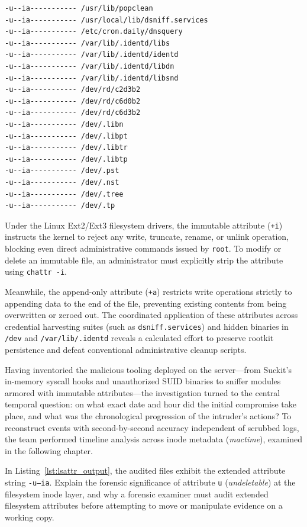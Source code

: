 \begin{lstlisting}[style=terminal,caption={Files hardened with immutable (+i) and append-only (+a) attributes.},label={lst:lsattr_output}]
-u--ia----------- /usr/lib/popclean
-u--ia----------- /usr/local/lib/dsniff.services
-u--ia----------- /etc/cron.daily/dnsquery
-u--ia----------- /var/lib/.identd/libs
-u--ia----------- /var/lib/.identd/identd
-u--ia----------- /var/lib/.identd/libdn
-u--ia----------- /var/lib/.identd/libsnd
-u--ia----------- /dev/rd/c2d3b2
-u--ia----------- /dev/rd/c6d0b2
-u--ia----------- /dev/rd/c6d3b2
-u--ia----------- /dev/.libn
-u--ia----------- /dev/.libpt
-u--ia----------- /dev/.libtr
-u--ia----------- /dev/.libtp
-u--ia----------- /dev/.pst
-u--ia----------- /dev/.nst
-u--ia----------- /dev/.tree
-u--ia----------- /dev/.tp
\end{lstlisting}

Under the Linux Ext2/Ext3 filesystem drivers, the immutable attribute (\texttt{+i}) instructs the kernel to reject any write, truncate, rename, or unlink operation, blocking even direct administrative commands issued by \texttt{root}. To modify or delete an immutable file, an administrator must explicitly strip the attribute using \texttt{chattr -i}.

Meanwhile, the append-only attribute (\texttt{+a}) restricts write operations strictly to appending data to the end of the file, preventing existing contents from being overwritten or zeroed out. The coordinated application of these attributes across credential harvesting suites (such as \texttt{dsniff.services}) and hidden binaries in \texttt{/dev} and \texttt{/var/lib/.identd} reveals a calculated effort to preserve rootkit persistence and defeat conventional administrative cleanup scripts.

Having inventoried the malicious tooling deployed on the server---from Suckit's in-memory syscall hooks and unauthorized SUID binaries to sniffer modules armored with immutable attributes---the investigation turned to the central temporal question: on what exact date and hour did the initial compromise take place, and what was the chronological progression of the intruder's actions? To reconstruct events with second-by-second accuracy independent of scrubbed logs, the team performed timeline analysis across inode metadata (\textit{mactime}), examined in the following chapter.

\begin{retoforense}
In Listing~\ref{lst:lsattr_output}, the audited files exhibit the extended attribute string \texttt{-u--ia}. Explain the forensic significance of attribute \texttt{u} (\textit{undeletable}) at the filesystem inode layer, and why a forensic examiner must audit extended filesystem attributes before attempting to move or manipulate evidence on a working copy.
\end{retoforense}

